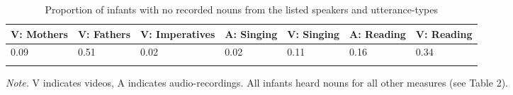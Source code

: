 \documentclass[man]{apa6}
\theoremstyle{definition}
\theoremstyle{definition}
\theoremstyle{definition}
\theoremstyle{remark}
\begin{document}
\pagebreak

\begin{table}[tbp]
\begin{center}
\begin{threeparttable}
\caption{\label{tab:propna-missing-tables}Proportion of infants with no recorded nouns from the listed speakers and utterance-types}
\small{
\begin{tabular}{lllllll}
\toprule
V: Mothers & \multicolumn{1}{c}{V: Fathers} & \multicolumn{1}{c}{V: Imperatives} & \multicolumn{1}{c}{A: Singing} & \multicolumn{1}{c}{V: Singing} & \multicolumn{1}{c}{A: Reading} & \multicolumn{1}{c}{V: Reading}\\
\midrule
0.09 & 0.51 & 0.02 & 0.02 & 0.11 & 0.16 & 0.34\\
\bottomrule
\addlinespace
\end{tabular}
}
\begin{tablenotes}[para]
\textit{Note.} V indicates videos, A indicates audio-recordings. All infants heard nouns for all other measures (see Table 2).
\end{tablenotes}
\end{threeparttable}
\end{center}
\end{table}

\pagebreak
\end{document}
